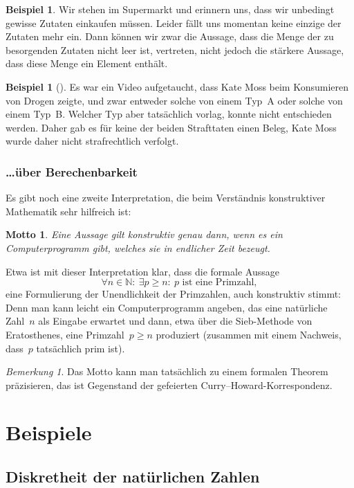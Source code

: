 \documentclass[a4paper,ngerman,12pt]{scrartcl}
\theoremstyle{definition}
\newtheorem{bsp}[defn]{Beispiel}
\theoremstyle{plain}
\newtheorem{motto}[defn]{Motto}
\theoremstyle{remark}
\newtheorem{bem}[defn]{Bemerkung}
\newcommand{\NN}{\mathbb{N}}
\renewcommand{\_}{\mathpunct{.}\,}
\newcommand{\?}{\,{:}\,}
\begin{document}
\begin{bsp}Wir stehen im Supermarkt und erinnern uns, dass wir unbedingt
gewisse Zutaten einkaufen müssen. Leider fällt uns momentan keine einzige der
Zutaten mehr ein. Dann können wir zwar die Aussage, dass die Menge der zu
besorgenden Zutaten nicht leer ist, vertreten, nicht jedoch die stärkere
Aussage, dass diese Menge ein Element enthält.\end{bsp}

\begin{bsp}[\cite{sigfpe:katemoss}]
Es war ein Video aufgetaucht, dass Kate Moss beim Konsumieren von Drogen zeigte,
und zwar entweder solche von einem Typ~A oder solche von einem Typ~B. Welcher
Typ aber tatsächlich vorlag, konnte nicht entschieden werden. Daher gab es für
keine der beiden Strafttaten einen Beleg, Kate Moss wurde daher nicht
strafrechtlich verfolgt.
\end{bsp}


\subsubsection*{\ldots über Berechenbarkeit}

Es gibt noch eine zweite Interpretation, die beim Verständnis konstruktiver
Mathematik sehr hilfreich ist:
\begin{motto}Eine Aussage gilt konstruktiv genau dann, wenn es ein
Computerprogramm gibt, welches sie in endlicher Zeit bezeugt.\end{motto}
Etwa ist mit dieser Interpretation klar, dass die formale Aussage
\[ \forall n \in \NN{:}\ \exists p \geq n{:}\ \text{$p$ ist eine Primzahl}, \]
eine Formulierung der Unendlichkeit der Primzahlen, auch konstruktiv
stimmt: Denn man kann leicht ein Computerprogramm angeben, das eine natürliche
Zahl~$n$ als Eingabe erwartet und dann, etwa über die Sieb-Methode von
Eratosthenes, eine Primzahl~$p \geq n$ produziert (zusammen mit einem Nachweis,
dass~$p$ tatsächlich prim ist).

\begin{bem}Das Motto kann man tatsächlich zu einem formalen Theorem
präzisieren, das ist Gegenstand der gefeierten
Curry--Howard-Korrespondenz.\end{bem}


\section{Beispiele}

\subsection{Diskretheit der natürlichen Zahlen}
\end{document}
